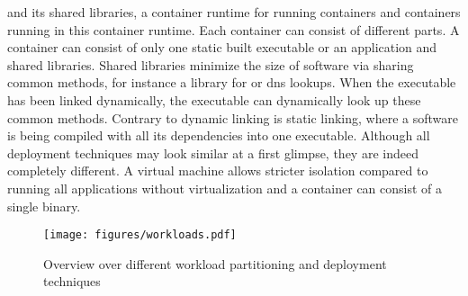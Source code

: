\documentclass[titlepage]{report}
\begin{document}
and its shared libraries, a container runtime for running containers and containers running
in this container runtime. Each container can consist of different parts. A container can consist of only one static built executable or an application and shared libraries.
Shared libraries minimize the size of software via sharing common methods, for instance a library for  or \gls{dns} lookups. When the executable has been linked dynamically,
the executable can dynamically look up these common methods.
Contrary to dynamic linking is static linking, where a software is being compiled with all its dependencies into one executable. Although all deployment techniques may look similar at a first glimpse,
they are indeed completely different. A virtual machine allows stricter isolation compared to running all applications without virtualization and a container can consist of a single binary.
\begin{figure}
    \centering
    \texttt{[image: figures/workloads.pdf]}
    \caption{Overview over different workload partitioning and deployment techniques}\label{fig:workloads}
\end{figure}
\end{document}
